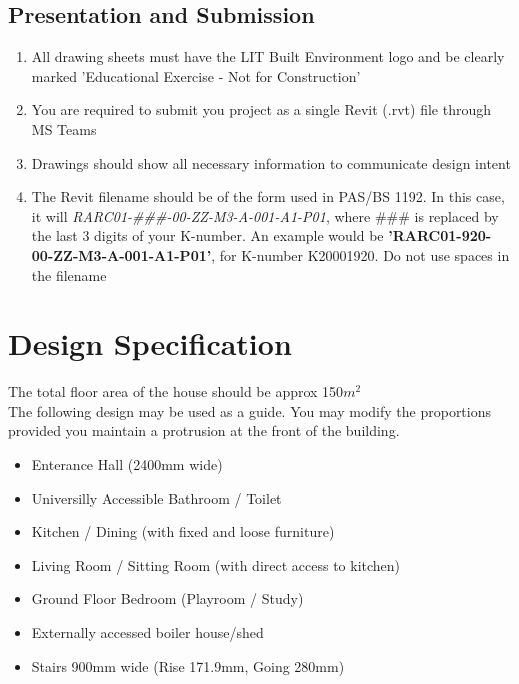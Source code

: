 \begin{flushleft}
\section*{Presentation and Submission}
\end{flushleft}


\begin{enumerate}
	\item All drawing sheets must have the LIT Built Environment logo and be clearly marked 'Educational Exercise - Not for Construction'
	\item You are required to submit you project as a single Revit (.rvt) file through MS Teams
	\item Drawings should show all necessary information to communicate design intent
	\item The Revit filename should be of the form used in PAS/BS 1192.  In this case, it will \textit{RARC01-\#\#\#-00-ZZ-M3-A-001-A1-P01}, where \#\#\# is replaced by the last 3 digits of your K-number. An example would be \textbf{'RARC01-920-00-ZZ-M3-A-001-A1-P01'}, for K-number K20001920.  Do not use spaces in the filename
\end{enumerate}


\newpage

\section*{Design Specification}



The total floor area of the house should be approx 150$m^2$\\

The following design may be used as a guide.  You may modify the proportions provided you maintain a protrusion at the front of the building.


\begin{itemize}
	\item Enterance Hall (2400mm wide)
	\item Universilly Accessible Bathroom / Toilet
	\item Kitchen / Dining (with fixed and loose furniture)
	\item Living Room / Sitting Room (with direct access to kitchen)
	\item Ground Floor Bedroom (Playroom / Study)
	\item Externally accessed boiler house/shed
	\item Stairs 900mm wide (Rise 171.9mm, Going 280mm)
\end{itemize}



